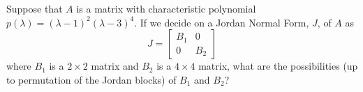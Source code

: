 \documentclass[11pt]{exam}
\begin{document}
\begin{questions}
\newpage
\addpoints
\question[20] Suppose that $A$ is a matrix with characteristic polynomial $p(\lambda)=(\lambda -1)^2(\lambda-3)^4$. If we decide on a Jordan Normal Form, $J$, of $A$ as $$J= \begin{bmatrix}
B_1 & 0 \\
0 & B_2 
\end{bmatrix}$$ where $B_1$ is a $2 \times 2$ matrix and $B_2$ is a $4 \times 4$ matrix, what are the possibilities (up to permutation of the Jordan blocks) of $B_1$ and $B_2$?  



\end{questions}
\end{document}
